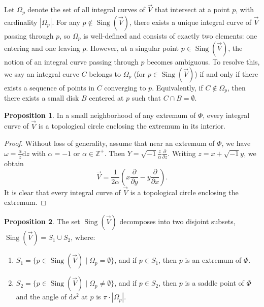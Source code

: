\documentclass[microtype]{gtpart}     %
\theoremstyle{definition}
\newtheorem{prop}{Proposition}[section]
\begin{document}
Let $\Omega_{p}$ denote the set of all integral curves of $\vec{V}$ that intersect at a point $p$, with cardinality $|\Omega_{p}|$. For any $p \notin \operatorname{Sing}(\vec{V})$, there exists a unique integral curve of $\vec{V}$ passing through $p$, so $\Omega_{p}$ is well-defined and consists of exactly two elements: one entering and one leaving $p$. However, at a singular point $p \in \operatorname{Sing}(\vec{V})$, the notion of an integral curve passing through $p$ becomes ambiguous. To resolve this, we say an integral curve $C$ belongs to $\Omega_{p}$ (for $p \in \operatorname{Sing}(\vec{V})$) if and only if there exists a sequence of points in $C$ converging to $p$. Equivalently, if $C \notin \Omega_{p}$, then there exists a small disk $B$ centered at $p$ such that $C \cap B = \emptyset$.

\begin{prop}\label{Pro-2-3}
In a small neighborhood of any extremum of $\Phi$, every integral curve of $\vec{V}$ is a topological circle enclosing the extremum in its interior.
\end{prop}

\begin{proof}
Without loss of generality, assume that near an extremum of $\Phi$, we have $\omega = \frac{\alpha}{z} \mathrm{d}z$ with $\alpha=-1$ or $\alpha \in \mathbb{Z}^{+}$. Then $Y = \sqrt{-1} \frac{z}{\alpha} \frac{\partial}{\partial z}$. Writing $z = x + \sqrt{-1}y$, we obtain
\[
\vec{V} = \frac{1}{2\alpha} \left( x \frac{\partial}{\partial y} - y \frac{\partial}{\partial x} \right).
\]
It is clear that every integral curve of $\vec{V}$ is a topological circle enclosing the extremum.
\end{proof}

\begin{prop}\label{Pro-2-4}
The set $\operatorname{Sing}(\vec{V})$ decomposes into two disjoint subsets, $\operatorname{Sing}(\vec{V}) = S_1 \cup S_2$, where:
\begin{enumerate}
\item $S_1 = \{ p \in \operatorname{Sing}(\vec{V}) \mid \Omega_p = \emptyset \}$, and if $p \in S_1$, then $p$ is an extremum of $\Phi$.
\item $S_2 = \{ p \in \operatorname{Sing}(\vec{V}) \mid \Omega_p \neq \emptyset \}$, and if $p \in S_2$, then $p$ is a saddle point of $\Phi$ and the angle of $\mathrm{d}s^2$ at $p$ is $\pi \cdot |\Omega_p|$.
\end{enumerate}
\end{prop}
\end{document}
